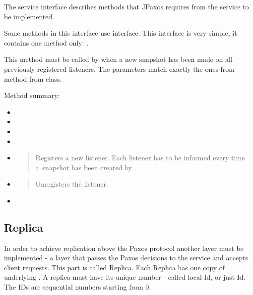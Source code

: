\label{api:service-interface}\label{api:jpaxos-service}
The service interface describes methods that JPaxos requires from the service to be implemented.

Some methods in this interface use  interface. This interface is very simple, it contains one method only: .

This method must be called by  when a new snapshot has been made on all previously registered listeners. The parameters match exactly the ones from  method from  class.

Method summary:
\begin{itemize}
\item {} 

\item {} 

\item {} 

\item {} 

\item {} 
\begin{quote}

Registers a new listener. Each listener has to be informed every time a~snapshot has been created by .
\end{quote}

\item {} 
\begin{quote}

Unregisters the listener.
\end{quote}

\item {} 

\end{itemize}


\subsection{Replica}
\label{api:jpaxos-replica}\label{api:replica}
In order to achieve replication above the Paxos protocol another layer must be implemented - a layer that passes the Paxos decisions to the service and accepts client requests. This part is called Replica. Each Replica has one copy of underlying . A replica must have its unique number - called local Id, or just Id. The IDs are sequential numbers starting from 0.

